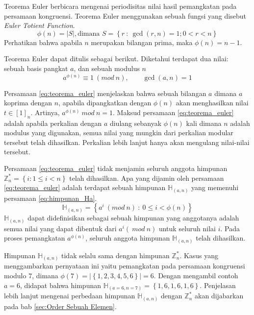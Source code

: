 Teorema Euler berbicara mengenai periodisitas nilai hasil pemangkatan pada persamaan kongruensi. Teorema Euler menggunakan sebuah fungsi yang disebut \textit{Euler Totient Function}.\cite{stallings_cryptography}
\begin{equation}
\phi(n)=\left|S\right|, \text{dimana } S=\left\{r\ :\ \gcd (r,n)=1; 0 < r < n \right\}
\label{eq:euler_totient_function}
\end{equation}
Perhatikan bahwa apabila $ n $ merupakan bilangan prima, maka $ \phi(n)=n-1 $.

Teorema Euler dapat ditulis sebagai berikut. Diketahui terdapat dua nilai: sebuah basis pangkat $ a $, dan sebuah modulus $ n $
\begin{equation}
a^{\phi(n)}\equiv 1\ (mod\ n), \qquad \gcd(a,n)=1
\label{eq:teorema_euler}
\end{equation}

Persamaan \eqref{eq:teorema_euler} menjelaskan bahwa sebuah bilangan $ a $ dimana $ a $ koprima dengan $ n $, apabila dipangkatkan dengan $ \phi(n) $ akan menghasilkan nilai $ t \in [1]_n $. Artinya, $ a^{\phi(n)}\ mod\ n=1 $. Maksud persamaan \eqref{eq:teorema_euler} adalah apabila perkalian dengan $ a $ diulang sebanyak $ \phi(n) $ kali dimana $ n $ adalah modulus yang digunakan, semua nilai yang mungkin dari perkalian modular tersebut telah dihasilkan. Perkalian lebih lanjut hanya akan mengulang nilai-nilai tersebut.

Persamaan \eqref{eq:teorema_euler} tidak menjamin seluruh anggota himpunan $ \mathbb{Z}_n^{*}=\left\{ i : 1 \leq i < n\right\} $ telah dihasilkan. Apa yang dijamin oleh persamaan \eqref{eq:teorema_euler} adalah terdapat sebuah himpunan $ \mathbb{H}_{(a,n)} $ yang memenuhi persamaan \eqref{eq:himpunan_Ha}.
\begin{equation}
\mathbb{H}_{(a,n)}=\left\{a^{i}\ (mod\ n)\ :\ 0 \leq i < \phi(n) \right\}
\label{eq:himpunan_Ha}
\end{equation}
$ \mathbb{H}_{(a, n)} $ dapat didefinisikan sebagai sebuah himpunan yang anggotanya adalah semua nilai yang dapat dibentuk dari $ a^i (\ mod\ n) $ untuk seluruh nilai $ i $. Pada proses pemangkatan $ a^{\phi(n)} $, seluruh anggota himpunan $ \mathbb{H}_{(a, n)} $ telah dihasilkan.

Himpunan $ \mathbb{H}_{(a, n)} $ tidak selalu sama dengan himpunan $ \mathbb{Z}_n^{*} $. Kasus yang menggambarkan pernyataan ini yaitu pemangkatan pada persamaan kongruensi modulo 7, dimana $ \phi(7)=\left|\left\{1,2,3,4,5,6\right\}\right|\allowbreak=6 $. Dengan mengambil contoh $ a=6 $, didapat bahwa himpunan $ \mathbb{H}_{(a=6,n=7)}=\left\{1,6,1,6,1,6\right\} $. Penjelasan lebih lanjut mengenai perbedaan himpunan $ \mathbb{H}_{(a, n)} $ dengan $ \mathbb{Z}_n^{*} $ akan dijabarkan pada bab \ref{sec:Order Sebuah Elemen}.

